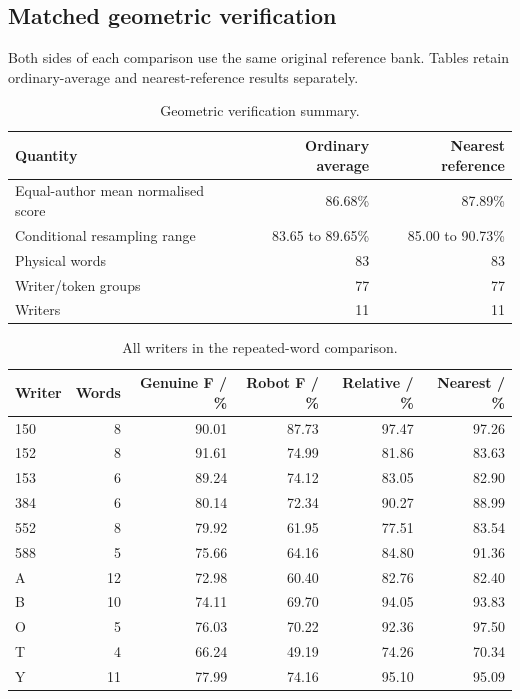 \subsection{Matched geometric verification}\label{app:res-geometric}
Both sides of each comparison use the same original reference bank. Tables retain ordinary-average and nearest-reference results separately.
\begin{table}[H]\centering\small
\begin{tabular}{lrr}
\toprule Quantity & Ordinary average & Nearest reference\\\midrule
Equal-author mean normalised score & 86.68\% & 87.89\%\\
Conditional resampling range & 83.65 to 89.65\% & 85.00 to 90.73\%\\
Physical words & 83 & 83\\
Writer/token groups & 77 & 77\\
Writers & 11 & 11\\
\bottomrule\end{tabular}
\caption{Geometric verification summary.}\label{tab:app-geometric-summary}\end{table}
\begin{table}[H]\centering\small
\begin{tabular}{lrrrrr}
\toprule Writer & Words & Genuine F / \% & Robot F / \% & Relative / \% & Nearest / \%\\\midrule
150 & 8 & 90.01 & 87.73 & 97.47 & 97.26\\
152 & 8 & 91.61 & 74.99 & 81.86 & 83.63\\
153 & 6 & 89.24 & 74.12 & 83.05 & 82.90\\
384 & 6 & 80.14 & 72.34 & 90.27 & 88.99\\
552 & 8 & 79.92 & 61.95 & 77.51 & 83.54\\
588 & 5 & 75.66 & 64.16 & 84.80 & 91.36\\
A & 12 & 72.98 & 60.40 & 82.76 & 82.40\\
B & 10 & 74.11 & 69.70 & 94.05 & 93.83\\
O & 5 & 76.03 & 70.22 & 92.36 & 97.50\\
T & 4 & 66.24 & 49.19 & 74.26 & 70.34\\
Y & 11 & 77.99 & 74.16 & 95.10 & 95.09\\
\bottomrule\end{tabular}
\caption{All writers in the repeated-word comparison.}\label{tab:app-geometric-writers}\end{table}
